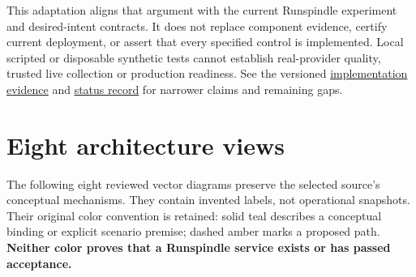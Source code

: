 \documentclass[11pt]{article}
\begin{document}
This adaptation aligns that argument with the current Runspindle experiment and desired-intent contracts. It does not replace component evidence, certify current deployment, or assert that every specified control is implemented. Local scripted or disposable synthetic tests cannot establish real-provider quality, trusted live collection or production readiness. See the versioned \href{https://github.com/newdarwindev/runspindle-refinery/blob/main/docs/IMPLEMENTATION_EVIDENCE.md}{implementation evidence} and \href{https://github.com/newdarwindev/runspindle-refinery/blob/main/STATUS.json}{status record} for narrower claims and remaining gaps.
\clearpage
\section{Eight architecture views}
The following eight reviewed vector diagrams preserve the selected source's conceptual mechanisms. They contain invented labels, not operational snapshots. Their original color convention is retained: solid teal describes a conceptual binding or explicit scenario premise; dashed amber marks a proposed path. \textbf{Neither color proves that a Runspindle service exists or has passed acceptance.}
\end{document}
